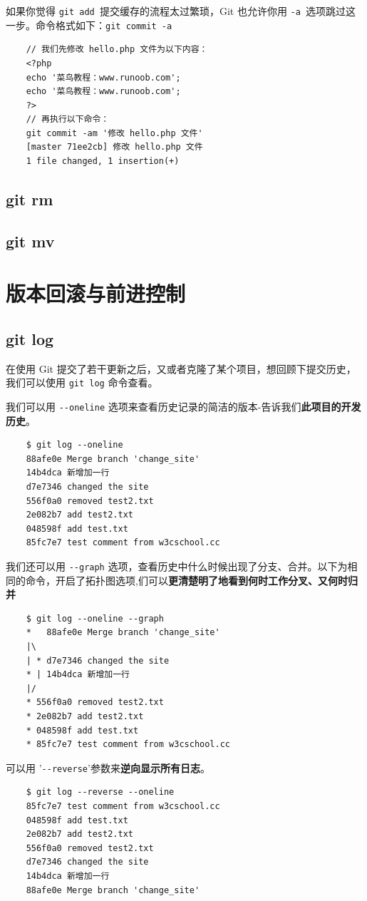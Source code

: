 \documentclass[UTF8,a4paper,12pt]{ctexbook}
\begin{document}
			如果你觉得 \verb|git add |提交缓存的流程太过繁琐，Git 也允许你用 \verb|-a |选项跳过这一步。命令格式如下：\verb|git commit -a|
			\begin{lstlisting}
	// 我们先修改 hello.php 文件为以下内容：
	<?php
	echo '菜鸟教程：www.runoob.com';
	echo '菜鸟教程：www.runoob.com';
	?>
	// 再执行以下命令：
	git commit -am '修改 hello.php 文件'
	[master 71ee2cb] 修改 hello.php 文件
	1 file changed, 1 insertion(+)
			\end{lstlisting}
			
		\subsection{git rm}
		
		\subsection{git mv}
		
		
	\section{版本回滚与前进控制}
		\subsection{git log}
			在使用 Git 提交了若干更新之后，又或者克隆了某个项目，想回顾下提交历史，我们可以使用 \verb|git log| 命令查看。
			
			我们可以用 \verb|--oneline| 选项来查看历史记录的简洁的版本-告诉我们\textbf{此项目的开发历史}。
			\begin{lstlisting}
	$ git log --oneline
	88afe0e Merge branch 'change_site'
	14b4dca 新增加一行
	d7e7346 changed the site
	556f0a0 removed test2.txt
	2e082b7 add test2.txt
	048598f add test.txt
	85fc7e7 test comment from w3cschool.cc
			\end{lstlisting}
			
			我们还可以用 \verb|--graph| 选项，查看历史中什么时候出现了分支、合并。以下为相同的命令，开启了拓扑图选项,们可以\textbf{更清楚明了地看到何时工作分叉、又何时归并}
			\begin{lstlisting}
	$ git log --oneline --graph
	*   88afe0e Merge branch 'change_site'
	|\  
	| * d7e7346 changed the site
	* | 14b4dca 新增加一行
	|/  
	* 556f0a0 removed test2.txt
	* 2e082b7 add test2.txt
	* 048598f add test.txt
	* 85fc7e7 test comment from w3cschool.cc
			\end{lstlisting}
			
			可以用 '\verb|--reverse|'参数来\textbf{逆向显示所有日志}。
			\begin{lstlisting}
	$ git log --reverse --oneline
	85fc7e7 test comment from w3cschool.cc
	048598f add test.txt
	2e082b7 add test2.txt
	556f0a0 removed test2.txt
	d7e7346 changed the site
	14b4dca 新增加一行
	88afe0e Merge branch 'change_site'
			\end{lstlisting}
			
\end{document}

